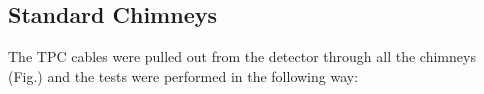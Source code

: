 


\subsection{Standard Chimneys}
\label{ssec:stand_chimn}



The TPC cables were pulled out from the detector through all the chimneys (Fig.) and the tests were performed in the following way: \\





 




